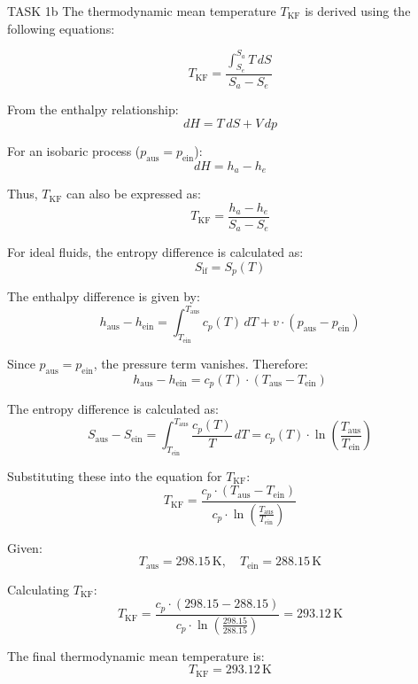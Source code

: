 TASK 1b  
The thermodynamic mean temperature \( T_{\text{KF}} \) is derived using the following equations:  

\[
T_{\text{KF}} = \frac{\int_{S_e}^{S_a} T \, dS}{S_a - S_e}
\]

From the enthalpy relationship:  
\[
dH = T \, dS + V \, dp
\]

For an isobaric process (\( p_{\text{aus}} = p_{\text{ein}} \)):  
\[
dH = h_a - h_e
\]

Thus, \( T_{\text{KF}} \) can also be expressed as:  
\[
T_{\text{KF}} = \frac{h_a - h_e}{S_a - S_e}
\]

For ideal fluids, the entropy difference is calculated as:  
\[
S_{\text{if}} = S_p(T)
\]

The enthalpy difference is given by:  
\[
h_{\text{aus}} - h_{\text{ein}} = \int_{T_{\text{ein}}}^{T_{\text{aus}}} c_p(T) \, dT + v \cdot (p_{\text{aus}} - p_{\text{ein}})
\]

Since \( p_{\text{aus}} = p_{\text{ein}} \), the pressure term vanishes. Therefore:  
\[
h_{\text{aus}} - h_{\text{ein}} = c_p(T) \cdot (T_{\text{aus}} - T_{\text{ein}})
\]

The entropy difference is calculated as:  
\[
S_{\text{aus}} - S_{\text{ein}} = \int_{T_{\text{ein}}}^{T_{\text{aus}}} \frac{c_p(T)}{T} \, dT = c_p(T) \cdot \ln\left(\frac{T_{\text{aus}}}{T_{\text{ein}}}\right)
\]

Substituting these into the equation for \( T_{\text{KF}} \):  
\[
T_{\text{KF}} = \frac{c_p \cdot (T_{\text{aus}} - T_{\text{ein}})}{c_p \cdot \ln\left(\frac{T_{\text{aus}}}{T_{\text{ein}}}\right)}
\]

Given:  
\[
T_{\text{aus}} = 298.15 \, \text{K}, \quad T_{\text{ein}} = 288.15 \, \text{K}
\]

Calculating \( T_{\text{KF}} \):  
\[
T_{\text{KF}} = \frac{c_p \cdot (298.15 - 288.15)}{c_p \cdot \ln\left(\frac{298.15}{288.15}\right)} = 293.12 \, \text{K}
\]  

The final thermodynamic mean temperature is:  
\[
T_{\text{KF}} = 293.12 \, \text{K}
\]
